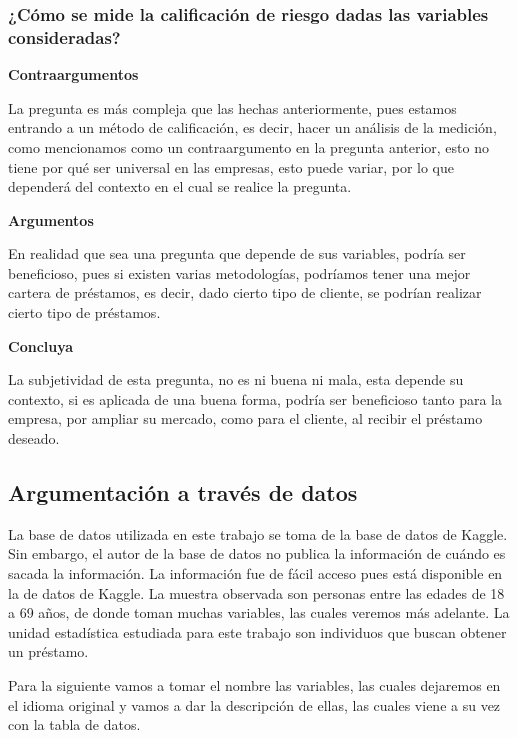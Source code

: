 \documentclass[
  letterpaper,
  DIV=11,
  numbers=noendperiod]{scrreprt}
\begin{document}
\subsubsection{\texorpdfstring{\textbf{¿Cómo se mide la calificación de
riesgo dadas las variables
consideradas?}}{¿Cómo se mide la calificación de riesgo dadas las variables consideradas?}}\label{cuxf3mo-se-mide-la-calificaciuxf3n-de-riesgo-dadas-las-variables-consideradas}

\textbf{Contraargumentos}

La pregunta es más compleja que las hechas anteriormente, pues estamos
entrando a un método de calificación, es decir, hacer un análisis de la
medición, como mencionamos como un contraargumento en la pregunta
anterior, esto no tiene por qué ser universal en las empresas, esto
puede variar, por lo que dependerá del contexto en el cual se realice la
pregunta.

\textbf{Argumentos}

En realidad que sea una pregunta que depende de sus variables, podría
ser beneficioso, pues si existen varias metodologías, podríamos tener
una mejor cartera de préstamos, es decir, dado cierto tipo de cliente,
se podrían realizar cierto tipo de préstamos.

\textbf{Concluya}

La subjetividad de esta pregunta, no es ni buena ni mala, esta depende
su contexto, si es aplicada de una buena forma, podría ser beneficioso
tanto para la empresa, por ampliar su mercado, como para el cliente, al
recibir el préstamo deseado.

\subsection{Argumentación a través de
datos}\label{argumentaciuxf3n-a-travuxe9s-de-datos}

La base de datos utilizada en este trabajo se toma de la base de datos
de Kaggle. Sin embargo, el autor de la base de datos no publica la
información de cuándo es sacada la información. La información fue de
fácil acceso pues está disponible en la de datos de Kaggle. La muestra
observada son personas entre las edades de 18 a 69 años, de donde toman
muchas variables, las cuales veremos más adelante. La unidad estadística
estudiada para este trabajo son individuos que buscan obtener un
préstamo.

Para la siguiente vamos a tomar el nombre las variables, las cuales
dejaremos en el idioma original y vamos a dar la descripción de ellas,
las cuales viene a su vez con la tabla de datos.
\end{document}
